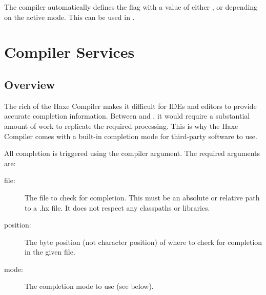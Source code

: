 The compiler automatically defines the flag  with a value of either ,  or  depending on the active mode. This can be used in .






\section{Compiler Services}
\label{cr-completion}

\subsection{Overview}
\label{cr-completion-overview}

The rich  of the Haxe Compiler makes it difficult for IDEs and editors to provide accurate completion information. Between  and , it would require a substantial amount of work to replicate the required processing. This is why the Haxe Compiler comes with a built-in completion mode for third-party software to use.

All completion is triggered using the  compiler argument. The required arguments are:

\begin{description}
    \item[file:] The file to check for completion. This must be an absolute or relative path to a .hx file. It does not respect any classpaths or libraries.
    \item[position:] The byte position (not character position) of where to check for completion in the given file.
    \item[mode:] The completion mode to use (see below).
\end{description}

